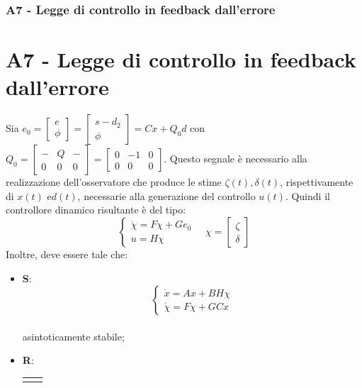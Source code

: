 \documentclass{beamer}
\begin{document}
\begin{frame}
	\frametitle{A7 - Legge di controllo in feedback dall'errore}%
	\section{A7 - Legge di controllo in feedback dall'errore}%
	Sia \(e_{0}=\begin{bmatrix}
		e \\\phi
	\end{bmatrix}=\begin{bmatrix}
		s-d_{2} \\\phi
	\end{bmatrix}=Cx+Q_{0}d\) con \(Q_{0}=\begin{bmatrix}
		- & Q & - \\0&0&0
	\end{bmatrix}=\begin{bmatrix}
		0 & -1 & 0 \\0&0&0
	\end{bmatrix}\). Questo segnale è necessario alla realizzazione dell'osservatore che produce le stime \(\zeta(t),\delta(t)\), rispettivamente di \(x(t)\) e\( d(t)\), necessarie alla generazione del controllo \(u(t)\). Quindi il controllore dinamico risultante è del tipo:
	\begin{equation*}
		\begin{cases}
			\dot{\chi}=F\chi+Ge_{0} \\
			u=H\chi
		\end{cases}\quad
		\chi=\begin{bmatrix}
			\zeta \\ \delta
		\end{bmatrix}
	\end{equation*}
	Inoltre, deve essere tale che:
	\begin{itemize}
		\item \textbf{S}:\begin{equation*}
			      \begin{cases}
				      \dot{x}=Ax+BH\chi \\
				      \dot{\chi}=F\chi+GCx
			      \end{cases}
		      \end{equation*}\\ asintoticamente stabile;
	\item \textbf{R}:
	\begin{tabular}{c c}
		\(\begin{aligned}
			\begin{cases}

\end{cases}
\end{aligned}
\end{tabular}
\end{itemize}
\end{frame}
\end{document}
